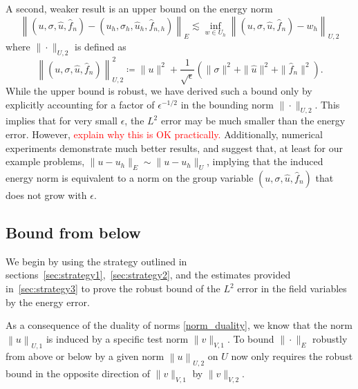\documentclass[11pt,onecolumn]{scrartcl}
\begin{document}
A second, weaker result is an upper bound on the energy norm
\[
\left\|\left(u,\sigma,\widehat{u},\widehat{f}_n\right)-\left(u_h,\sigma_h,\widehat{u}_h,\widehat{f}_{n,h}\right)\right\|_{E} \lesssim \inf_{w\in U_h}\left\|\left(u,\sigma,\widehat{u},\widehat{f}_n\right)-w_h\right\|_{U,2}
\]
where $\|\cdot \|_{U,2}$ is defined as
\[
\left\|\left(u,\sigma,\widehat{u},\widehat{f}_n\right)\right\|_{U,2}^2 \coloneqq \|u\|^2 + \frac{1}{\sqrt{\epsilon}}\left(\|\sigma\|^2 + \|\widehat{u}\|^2+ \|\widehat{f}_n\|^2\right).
\]
While the upper bound is robust, we have derived such a bound only by explicitly accounting for a factor of $\epsilon^{-1/2}$ in the bounding norm $\|\cdot \|_{U,2}$.  This implies that for very small $\epsilon$, the $L^2$ error may be much smaller than the energy error.  However, \textcolor{red}{explain why this is OK practically.}
Additionally, numerical experiments demonstrate much better results, and suggest that, at least for our example problems, $\|u-u_h\|_E \sim \|u-u_h\|_{U}$, implying that the induced energy norm is equivalent to a norm on the group variable $\left(u,\sigma,\widehat{u},\widehat{f}_n\right)$ that does not grow with $\epsilon$.  

\subsection{Bound from below}

We begin by using the strategy outlined in sections~\ref{sec:strategy1},~\ref{sec:strategy2}, and the estimates provided in~\ref{sec:strategy3} to prove the robust bound of the $L^2$ error in the field variables by the energy error.  

As a consequence of the duality of norms \eqref{norm_duality}, we know that the norm $\left\| u \right\|_{U,1}$ is induced by a specific test norm $\| v  \|_{V,1}$.  To bound $\|\cdot\|_E$ robustly from above or below by a given norm $\left\| u \right\|_{U,2}$ on $U$ now only requires the robust bound in the opposite direction of $\| v \|_{V,1}$ by $\|v\|_{V,2}$. 
\end{document}

